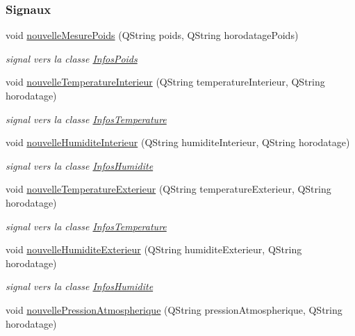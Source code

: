 \subsubsection*{Signaux}
\begin{DoxyCompactItemize}
\item 
void \hyperlink{class_ruche_abe5e5d4f4070766d5295d4dc6e0ce03c}{nouvelle\+Mesure\+Poids} (Q\+String poids, Q\+String horodatage\+Poids)
\begin{DoxyCompactList}\small\item\em signal vers la classe \hyperlink{class_infos_poids}{Infos\+Poids} \end{DoxyCompactList}\item 
void \hyperlink{class_ruche_ac4d6e0c0db4b5c992606bff88759b2c3}{nouvelle\+Temperature\+Interieur} (Q\+String temperature\+Interieur, Q\+String horodatage)
\begin{DoxyCompactList}\small\item\em signal vers la classe \hyperlink{class_infos_temperature}{Infos\+Temperature} \end{DoxyCompactList}\item 
void \hyperlink{class_ruche_a1d5094246e935d8ae5b9f08c9d042247}{nouvelle\+Humidite\+Interieur} (Q\+String humidite\+Interieur, Q\+String horodatage)
\begin{DoxyCompactList}\small\item\em signal vers la classe \hyperlink{class_infos_humidite}{Infos\+Humidite} \end{DoxyCompactList}\item 
void \hyperlink{class_ruche_aa8d28f554cd485c32d348a9147d2e236}{nouvelle\+Temperature\+Exterieur} (Q\+String temperature\+Exterieur, Q\+String horodatage)
\begin{DoxyCompactList}\small\item\em signal vers la classe \hyperlink{class_infos_temperature}{Infos\+Temperature} \end{DoxyCompactList}\item 
void \hyperlink{class_ruche_af88c6ed0320bfe45d5b15faa936caf4d}{nouvelle\+Humidite\+Exterieur} (Q\+String humidite\+Exterieur, Q\+String horodatage)
\begin{DoxyCompactList}\small\item\em signal vers la classe \hyperlink{class_infos_humidite}{Infos\+Humidite} \end{DoxyCompactList}\item 
void \hyperlink{class_ruche_ae72c86953df530bc5d3901ba66cf884d}{nouvelle\+Pression\+Atmospherique} (Q\+String pression\+Atmospherique, Q\+String horodatage)

\end{DoxyCompactItemize}
